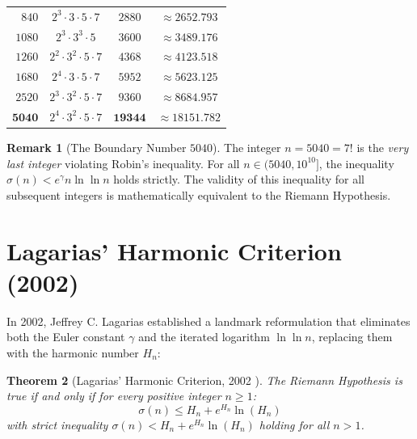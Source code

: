 \documentclass[11pt,a4paper]{article}
\newtheorem{theorem}{Theorem}[section]
\theoremstyle{definition}
\newtheorem{remark}[theorem]{Remark}
\begin{document}
\begin{table}[ht]
\begin{tabular}{@{}rccc@{}}
$840$ & $2^3 \cdot 3 \cdot 5 \cdot 7$ & $2880$ & $\approx 2652.793$ \\
$1080$ & $2^3 \cdot 3^3 \cdot 5$ & $3600$ & $\approx 3489.176$ \\
$1260$ & $2^2 \cdot 3^2 \cdot 5 \cdot 7$ & $4368$ & $\approx 4123.518$ \\
$1680$ & $2^4 \cdot 3 \cdot 5 \cdot 7$ & $5952$ & $\approx 5623.125$ \\
$2520$ & $2^3 \cdot 3^2 \cdot 5 \cdot 7$ & $9360$ & $\approx 8684.957$ \\
$\mathbf{5040}$ & $2^4 \cdot 3^2 \cdot 5 \cdot 7$ & $\mathbf{19344}$ & $\approx \mathbf{18151.782}$ \\
\bottomrule
\end{tabular}
\end{table}

\begin{remark}[The Boundary Number $5040$]
The integer $n = 5040 = 7!$ is the \emph{very last integer} violating Robin's inequality.
For all $n \in (5040, 10^{10}]$, the inequality $\sigma(n) < e^\gamma n \ln\ln n$ holds strictly.
The validity of this inequality for all subsequent integers is mathematically equivalent to the Riemann Hypothesis.
\end{remark}

\section{Lagarias' Harmonic Criterion (2002)}

In 2002, Jeffrey C. Lagarias \cite{lagarias2002} established a landmark reformulation that eliminates both the Euler constant $\gamma$ and the iterated logarithm $\ln\ln n$, replacing them with the harmonic number $H_n$:

\begin{theorem}[Lagarias' Harmonic Criterion, 2002 \cite{lagarias2002}]\label{thm:lagarias}
The Riemann Hypothesis is true if and only if for every positive integer $n \ge 1$:
\begin{equation}\label{eq:lagarias_ineq}
\sigma(n) \le H_n + e^{H_n} \ln(H_n)
\end{equation}
with strict inequality $\sigma(n) < H_n + e^{H_n} \ln(H_n)$ holding for all $n > 1$.
\end{theorem}
\end{document}
